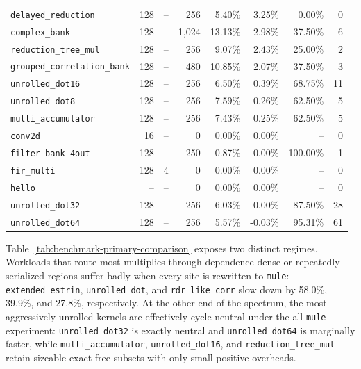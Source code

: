 \begin{table}[t]
{\begin{tabular}{l r r r r r r r}
\texttt{delayed\_reduction} & 128 & -- & 256 & 5.40\% & 3.25\% & 0.00\% & 0 \\
\texttt{complex\_bank} & 128 & -- & 1,024 & 13.13\% & 2.98\% & 37.50\% & 6 \\
\texttt{reduction\_tree\_mul} & 128 & -- & 256 & 9.07\% & 2.43\% & 25.00\% & 2 \\
\texttt{grouped\_correlation\_bank} & 128 & -- & 480 & 10.85\% & 2.07\% & 37.50\% & 3 \\
\texttt{unrolled\_dot16} & 128 & -- & 256 & 6.50\% & 0.39\% & 68.75\% & 11 \\
\texttt{unrolled\_dot8} & 128 & -- & 256 & 7.59\% & 0.26\% & 62.50\% & 5 \\
\texttt{multi\_accumulator} & 128 & -- & 256 & 7.43\% & 0.25\% & 62.50\% & 5 \\
\texttt{conv2d} & 16 & -- & 0 & 0.00\% & 0.00\% & -- & 0 \\
\texttt{filter\_bank\_4out} & 128 & -- & 250 & 0.87\% & 0.00\% & 100.00\% & 1 \\
\texttt{fir\_multi} & 128 & 4 & 0 & 0.00\% & 0.00\% & -- & 0 \\
\texttt{hello} & -- & -- & 0 & 0.00\% & 0.00\% & -- & 0 \\
\texttt{unrolled\_dot32} & 128 & -- & 256 & 6.03\% & 0.00\% & 87.50\% & 28 \\
\texttt{unrolled\_dot64} & 128 & -- & 256 & 5.57\% & -0.03\% & 95.31\% & 61 \\
\hline
\end{tabular}%
}
\end{table}

Table~\ref{tab:benchmark-primary-comparison} exposes two distinct
regimes. Workloads that route most multiplies through dependence-dense
or repeatedly serialized regions suffer badly when every site is
rewritten to \texttt{mule}: \texttt{extended\_estrin},
\texttt{unrolled\_dot}, and \texttt{rdr\_like\_corr} slow down by
58.0\%, 39.9\%, and 27.8\%, respectively. At the other end of the
spectrum, the most aggressively unrolled kernels are effectively
cycle-neutral under the all-\texttt{mule} experiment:
\texttt{unrolled\_dot32} is exactly neutral and
\texttt{unrolled\_dot64} is marginally faster, while
\texttt{multi\_accumulator}, \texttt{unrolled\_dot16}, and
\texttt{reduction\_tree\_mul} retain sizeable exact-free subsets with
only small positive overheads.

